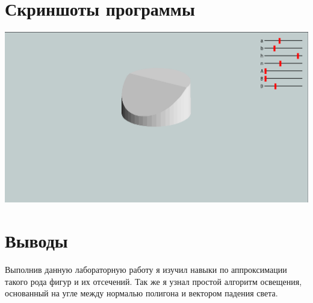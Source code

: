 \section{Скриншоты программы}
\includegraphics[scale=0.33]{L3_1.png}
\section{Выводы}
Выполнив данную лабораторную работу я изучил навыки по аппроксимации такого рода фигур и их отсечений.
Так же я узнал простой алгоритм освещения, основанный на угле между нормалью полигона и вектором падения света.
\pagebreak
